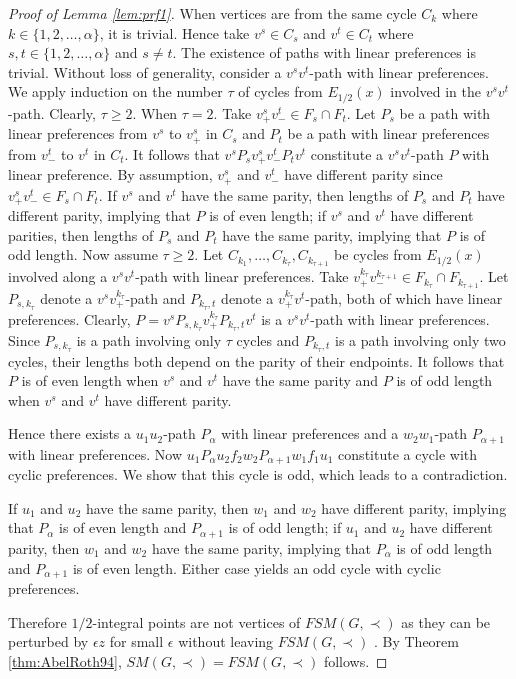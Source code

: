 \documentclass[11pt]{article}
\numberwithin{theorem}{section}
\begin{document}
\begin{proof}[Proof of Lemma \ref{lem:prf1}]
When vertices are from the same cycle $C_k$ where $k\in \{1,2,\ldots,\alpha\}$, it is trivial. Hence take $v^s \in C_s$ and $v^t\in C_t$ where $s,t\in \{1,2,\ldots,\alpha\}$ and $s\not=t$. The existence of paths with linear preferences is trivial. Without loss of generality, consider a $v^s v^t$-path with linear preferences. We apply induction on the number $\tau$ of cycles from $E_{1/2}(x)$ involved in the $v^s v^t$-path. Clearly, $\tau\geq 2$.
When $\tau=2$. Take $v^s_+ v^t_-\in F_s\cap F_t$. Let $P_s$ be a path with linear preferences from $v^s$ to $v^s_+$ in $C_s$ and $P_t$ be a path with linear preferences from $v^t_-$ to $v^t$ in $C_t$. It follows that $v^sP_s v^s_+ v^t_- P_t v^t$ constitute a $v^s v^t$-path $P$ with linear preference. By assumption, $v^s_+$ and $v^t_-$ have different parity since $v^s_+ v^t_-\in F_s\cap F_t$. If $v^s$ and $v^t$ have the same parity, then lengths of $P_s$ and $P_t$ have different parity, implying that $P$ is of even length; if $v^s$ and $v^t$ have different parities, then lengths of $P_s$ and $P_t$ have the same parity, implying that $P$ is of odd length.
Now assume $\tau\geq 2$. Let $C_{k_1},\ldots,C_{k_\tau},C_{k_{\tau+1}}$ be cycles from $E_{1/2}(x)$ involved along a $v^s v^t$-path with linear preferences. Take $v^{k_{\tau}}_+ v^{k_{\tau+1}}_- \in F_{k_{\tau}}\cap F_{k_{\tau+1}}$. Let $P_{s, k_{\tau}}$ denote a $v^s v^{k_{\tau}}_+$-path and $P_{k_{\tau},t}$ denote a $v^{k_{\tau}}_+ v^t$-path, both of which have linear preferences. Clearly, $P=v^sP_{s,k_\tau} v^{k_\tau}_+ P_{k_\tau, t} v^t$ is a $v^s v^t$-path with linear preferences. Since $P_{s, k_{\tau}}$ is a path involving only $\tau$ cycles and $P_{k_{\tau},t}$ is a path involving only two cycles, their lengths both depend on the parity of their endpoints. It follows that $P$ is of even length when $v^s$ and $v^t$ have the same parity and $P$ is of odd length when $v^s$ and $v^t$ have different parity.

Hence there exists a $u_1 u_2$-path $P_\alpha$ with linear preferences and a $w_2 w_1$-path $P_{\alpha+1}$ with linear preferences. Now $u_1 P_\alpha u_2 f_2 w_2 P_{\alpha+1} w_1 f_1 u_1$ constitute a cycle with cyclic preferences. We show that this cycle is odd, which leads to a contradiction.

If $u_1$ and $u_2$ have the same parity, then $w_1$ and $w_2$ have different parity, implying that $P_\alpha$ is of even length and $P_{\alpha+1}$ is of odd length;
if $u_1$ and $u_2$ have different parity, then $w_1$ and $w_2$ have the same parity, implying that $P_\alpha$  is of odd length and $P_{\alpha+1}$ is of even length. 
Either case yields an odd cycle with cyclic preferences.

Therefore $1/2$-integral points are not vertices of $FSM(G,\prec)$ as they can be perturbed by $\epsilon z$ for small $\epsilon$ without leaving $FSM(G,\prec)$ . By Theorem \ref{thm:AbelRoth94}, $SM(G,\prec)=FSM(G,\prec)$ follows. 
\end{proof}
\end{document}
